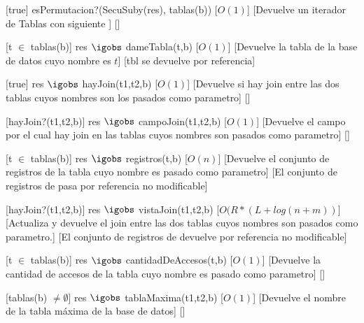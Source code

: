 \begin{Interfaz}
    [true]%
    {esPermutacion?(SecuSuby(res), tablas(b)) }%
    [$O(1)$]%
    [Devuelve un iterador de Tablas con siguiente ]%
    []%

    [t $\in$ tablas(b)]%
    {res $\igobs$ dameTabla(t,b) }%
    [$O(1)$]%
    [Devuelve la tabla de la base de datos cuyo nombre es $t$]%
    [tbl se devuelve por referencia]%

    [true]%
    {res $\igobs$ hayJoin(t1,t2,b) }%
    [$O(1)$]%
    [Devuelve si hay join entre las dos tablas cuyos nombres son los pasados como parametro]%
    []%

    [hayJoin?(t1,t2,b)]%
    {res $\igobs$ campoJoin(t1,t2,b)}%
    [$O(1)$]%
    [Devuelve el campo por el cual hay join en las tablas cuyos nombres son pasados como parametro]%
    []%

    [t $\in$ tablas(b)]%
    {res $\igobs$ registros(t,b)}%
    [$O(n)$]%
    [Devuelve el conjunto de registros de la tabla cuyo nombre es pasado como parametro]%
    [El conjunto de registros de pasa por referencia no modificable]%

    [hayJoin?(t1,t2,b)]%
    {res $\igobs$ vistaJoin(t1,t2,b)}%
    [$O(R*(L+log(n+m))$]%
    [Actualiza y devuelve el join entre las dos tablas cuyos nombres son pasados como parametro.]%
    [El conjunto de registros de devuelve por referencia no modificable]%

    [t $\in$ tablas(b)]%
    {res $\igobs$ cantidadDeAccesos(t,b)}%
    [$O(1)$]%
    [Devuelve la cantidad de accesos de la tabla cuyo nombre es pasado como parametro]%
    []%
    
    [tablas(b) $\neq \emptyset$]%
    {res $\igobs$ tablaMaxima(t1,t2,b)}%
    [$O(1)$]%
    [Devuelve el nombre de la tabla m\'axima de la base de datos]%
    []%


\end{Interfaz}
